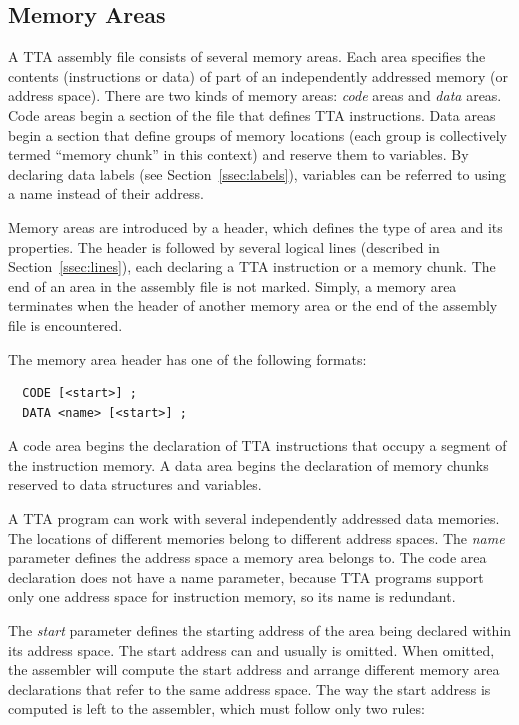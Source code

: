 \documentclass[a4paper,twoside]{tceusermanual}
\begin{document}
\subsection{Memory Areas}

A TTA assembly file consists of several memory areas. Each area specifies
the contents (instructions or data) of part of an independently addressed
memory (or address space). There are two kinds of memory areas: \emph{code}
areas and \emph{data} areas. Code areas begin a section of the file that
defines TTA instructions.  Data areas begin a section that define groups of
memory locations (each group is collectively termed ``memory chunk'' in this
context) and reserve them to variables. By declaring data labels (see
Section~\ref{ssec:labels}), variables can be referred to using a name
instead of their address.

Memory areas are introduced by a header, which defines the type of area and
its properties. The header is followed by several logical lines (described
in Section~\ref{ssec:lines}), each declaring a TTA instruction or a memory
chunk.  The end of an area in the assembly file is not marked. Simply, a
memory area terminates when the header of another memory area or the end of
the assembly file is encountered.

The memory area header has one of the following formats:
\begin{verbatim}
  CODE [<start>] ;
  DATA <name> [<start>] ;
\end{verbatim}

A code area begins the declaration of TTA instructions that occupy a segment
of the instruction memory. A data area begins the declaration of memory
chunks reserved to data structures and variables.

A TTA program can work with several independently addressed data memories.
The locations of different memories belong to different address spaces. The
\emph{name} parameter defines the address space a memory area belongs
to. The code area declaration does not have a name parameter, because TTA
programs support only one address space for instruction memory, so its name
is redundant.

The \emph{start} parameter defines the starting address of the area being
declared within its address space. The start address can and usually is
omitted. When omitted, the assembler will compute the start address and
arrange different memory area declarations that refer to the same address
space. The way the start address is computed is left to the assembler, which
must follow only two rules:
\end{document}
